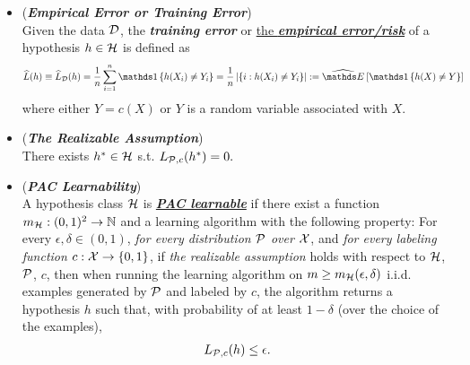 \documentclass[11pt]{article}
\begin{document}
\begin{itemize}
\item 
\begin{definition} (\emph{\textbf{Empirical Error or Training Error}}) \\
Given the data ${\mathcal D}$, the \emph{\textbf{training error}} or \underline{the \emph{\textbf{empirical error/risk}}} of a hypothesis $h \in {\mathcal H}$ is defined as 
\begin{align*}
\widehat{L}(h)   \equiv \widehat{L}_{\cD}(h)  &= \frac{1}{n}\sum_{i=1}^{n}\ind{h(X_i)\neq Y_i} = \frac{1}{n}\abs{\set{i: h(X_i)\neq Y_i}} := \Em{}{\ind{h(X) \neq Y}}
\end{align*} where either $Y = c(X)$ or $Y$ is a random variable associated with $X$.
\end{definition}

\item \begin{definition}(\emph{\textbf{The Realizable Assumption}})\\
There exists $h^{*} \in {\mathcal H}$ s.t. $L_{{\mathcal P}, c}(h^{*}) = 0.$
\end{definition}

\item \begin{definition}(\textbf{\emph{PAC Learnability}})\\
A hypothesis class ${\mathcal H}$ is \underline{\textbf{\emph{PAC learnable}}} if there exist a function $m_{{\mathcal H}}: (0,1)^2 \to {\mathbb N}$ and a learning algorithm with the following property: For every $\epsilon, \delta \in (0,1)$, \emph{for every distribution ${\mathcal P}$ over ${\mathcal X}$}, and \emph{for every labeling function $c: {\mathcal X} \to \left\{0,1\right\}$}, if \emph{the realizable assumption} holds with respect to ${\mathcal H}$, ${\mathcal P}$, $c$, then when running the learning algorithm on $m \ge m_{{\mathcal H}}(\epsilon, \delta)$ i.i.d. examples generated by ${\mathcal P}$ and labeled by $c$, the algorithm returns a hypothesis $h$ such that, with probability of at least $1- \delta$ (over the choice of the examples), 
\begin{align*}
L_{{\mathcal P}, c}(h) \le \epsilon.
\end{align*}
\end{definition}
\end{itemize}
\end{document}
